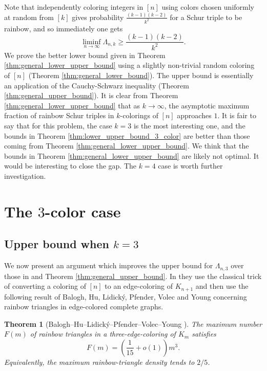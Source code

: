 \documentclass[11pt]{article}
\theoremstyle{plain}
\newtheorem{theorem}{Theorem}[section]
\numberwithin{equation}{section}
\begin{document}
Note that independently coloring integers in $[n]$ using colors chosen uniformly at random from $[k]$ gives probability $\frac{(k-1)(k-2)}{k^2}$ for a Schur triple to be rainbow, and so immediately one gets 
\[\liminf_{n\to \infty} \Lambda_{n,k} \ge \frac{(k-1)(k-2)}{k^2}.\]
We prove the better lower bound given in Theorem \ref{thm:general_lower_upper_bound} using a slightly non-trivial random coloring of $[n]$ (Theorem \ref{thm:general_lower_bound}). The upper bound is essentially an application of the Cauchy-Schwarz inequality (Theorem \ref{thm:general_upper_bound}). It is clear from Theorem \ref{thm:general_lower_upper_bound} that as $k\to \infty$, the asymptotic maximum fraction of rainbow Schur triples in $k$-colorings of $[n]$ approaches $1$. It is fair to say that for this problem, the case $k=3$ is the most interesting one, and the bounds in Theorem \ref{thm:lower_upper_bound_3_color} are better than those coming from Theorem \ref{thm:general_lower_upper_bound}. We think that the bounds in Theorem \ref{thm:general_lower_upper_bound} are likely not optimal. It would be interesting to close the gap. The $k=4$ case is worth further investigation. 

\section{The $3$-color case}

\subsection{Upper bound when $k=3$}

We now present an argument which improves the upper bound for $\Lambda_{n,3}$ over those in \cite{Parczyk_Spiegel_2026} and Theorem \ref{thm:general_upper_bound}. In \cite{Parczyk_Spiegel_2026} they use the classical trick of converting a coloring of \([n]\) to an edge-coloring of \(K_{n+1}\) and then use the following result of Balogh, Hu, Lidick\'y, Pfender, Volec and
Young \cite{Balogh_Hu_Lidicky_Pfender_Volec_Young_2017} concerning rainbow triangles in edge-colored complete graphs. 

\begin{theorem}[Balogh--Hu--Lidick\'y--Pfender--Volec--Young \cite{Balogh_Hu_Lidicky_Pfender_Volec_Young_2017}]\label{thm:raibow_triangles}
The maximum number $F(m)$ of rainbow triangles in a
three-edge-coloring of $K_m$ satisfies
\[
 F(m)=\left(\frac1{15}+o(1)\right)m^3.
\]
Equivalently, the maximum rainbow-triangle density tends to $2/5$.
\end{theorem}
\end{document}
